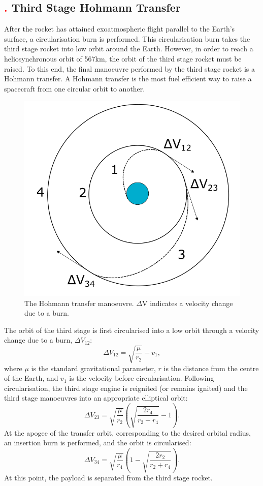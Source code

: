 \subsection{\textcolor{red}{.} Third Stage Hohmann Transfer}
After the rocket has attained exoatmospheric flight parallel to the Earth's surface, a circularisation burn is performed. This circularisation burn takes the third stage rocket into low orbit around the Earth. 
However, in order to reach a heliosynchronous orbit of 567km, the orbit of the third stage rocket must be raised. 
To this end, the final manoeuvre performed by the third stage rocket is a Hohmann transfer. A Hohmann transfer is the most fuel efficient way to raise a spacecraft from one circular orbit to another\cite{hohmann}. 
\begin{figure}
\centering
\includegraphics[width=0.7\linewidth]{figures/4_LODESTAR/Hohmann}
\caption{The Hohmann transfer manoeuvre. $\Delta$V indicates a velocity change due to a burn.}
\label{fig:Hohmann}
\end{figure}
The orbit of the third stage is first circularised into a low orbit through a velocity change due to a burn, $\Delta V_{12}$:
\begin{equation}
\Delta V_{12} = \sqrt{\dfrac{\mu}{r_2}} - v_1,
\end{equation}
where $\mu$ is the standard gravitational parameter, $r$ is the distance from the centre of the Earth, and $v_1$ is the velocity before circularisation. Following circularisation, the third stage engine is reignited (or remains ignited) and the third stage manoeuvres into an appropriate elliptical orbit: 
\begin{equation}
\Delta V_{23} = \sqrt{\dfrac{\mu}{r_2}} \left( \sqrt{\dfrac{2r_4}{r_2 + r_4}} -1 \right).
\end{equation}
At the apogee of the transfer orbit, corresponding to the desired orbital radius, an insertion burn is performed, and the orbit is circularised:
\begin{equation}
\Delta V_{34} = \sqrt{\dfrac{\mu}{r_4}} \left(1- \sqrt{\dfrac{2r_2}{r_2 + r_4}}  \right).
\end{equation}
At this point, the payload is separated from the third stage rocket. 

